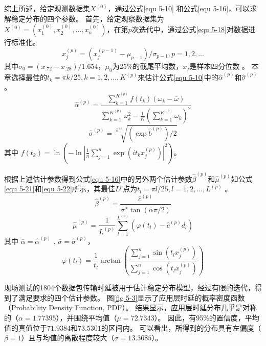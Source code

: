 综上所述，给定观测数据集$X^{(0)}$，通过公式\ref{equ 5-10} 和公式\ref{equ 5-16}，可以求解稳定分布的四个参数。
首先，给定观察数据集为$X^{(0)}=(x_1^{(0)}, x_2^{(0)}, \ldots, x_n^{(0)})$，在第$p$次迭代中，通过公式\ref{equ 5-18}对数据进行标准化。
\begin{equation}
x_{j}^{(p)}=\left(x_{j}^{(p-1)}-\mu_{p-1}\right) / \sigma_{p-1}, p = 1,2,\ldots
\label{equ 5-18}
\end{equation}
其中${\sigma_{0}=\left(x_{.72}-x_{.28}\right) / 1.654}$，$\mu_{0}$为25\%的截尾平均数，$x_{j}$是样本四分位数 \cite{fama1971parameter}。
本章选择最佳的$t_{k}=\pi k / 25, k=1,2,\ldots,K^{(p)}$\cite{koutrouvelis1980regression}来估计公式\ref{equ 5-10}中的$\hat{\alpha}^{(p)}$和$\hat{\sigma}^{(p)}$。
\begin{equation}
	{\hat{\alpha}^{(p)}=\frac{ \sum_{k=1}^{K^{(p)}} f\left(t_{k}\right)\left(\omega_{k}-\bar{\omega}\right)}{\sum_{k=1}^{K^{(p)}} \omega_{k}^{2}-\frac{1}{K}\left(\sum_{k=1}^{K^{(p)}} \omega_{k}\right)^{2}} } 
\end{equation}
\begin{equation}
	{\hat{\sigma}^{(p)}=\sqrt[\hat{\alpha}^{(p)}]{ (\exp \hat{b}^{(p)}) / 2}}
\end{equation}
其中 $f\left(t_{k}\right) = \ln \left(-\ln \left|\frac{1}{n} \sum_{j=1}^{n} \exp \left(i t_{k} x_{j}^{(p)}\right)\right|^{2}\right)$。

根据上述估计参数得到公式\ref{equ 5-16}中的另外两个估计参数$\hat{\beta}^{(p)}$和$\hat{\mu}^{(p)}$如公式\ref{equ 5-21}和\ref{equ 5-22}所示，其最佳$L^{p}$点为$t_{l}=\pi l / 25, l=1,2,\ldots,L^{(p)}$ \cite{koutrouvelis1980regression}。
\begin{equation}
\hat{\beta}^{(p)}= \frac{\hat{c}^{(p)}}{\bar{\sigma}^{\bar{\alpha}} \tan (\bar{\alpha} \pi / 2)}
\label{equ 5-21}
\end{equation}
\begin{equation}
\hat{\mu}^{(p)}= \frac{1}{L^{(p)}} \sum_{l=1}^{L^{(p)}}\left(\varphi\left(t_{l}\right)-\hat{c}^{(p)} d_{l}\right)
\label{equ 5-22}
\end{equation}
其中 $\bar{\alpha} =  {\hat{\alpha}^{(p)}}$ , $\bar{\sigma} =  {\hat{\sigma}^{(p)}}$，
\begin{equation}
\varphi\left(t_{l}\right) = \frac{1}{t_{l}} \arctan \left(\frac{ \sum_{j=1}^{n} \sin \left(t_l x_{j}^{(p)}\right)}{\sum_{j=1}^{n} \cos \left(t_l x_{j}^{(p)}\right)}\right)
\end{equation}

现场测试的1804个数据包传输时延被用于估计稳定分布模型，经过有限的迭代，得到了满足要求的四个估计参数。
图\ref{fig 5-3}显示了应用层时延的概率密度函数（Probability Density Function, PDF）。
结果显示，应用层时延分布几乎是对称的（$\alpha = 1.77395$），并围绕平均值（$\mu = 72.7343$）。
因此，有95\%的置信度，平均值的真值位于$71.9384$和$73.5301$的区间内。
可以看出，所得到的分布具有左偏度（$\beta = 1$）且与均值的离散程度较大（$\sigma = 13.3685$）。

